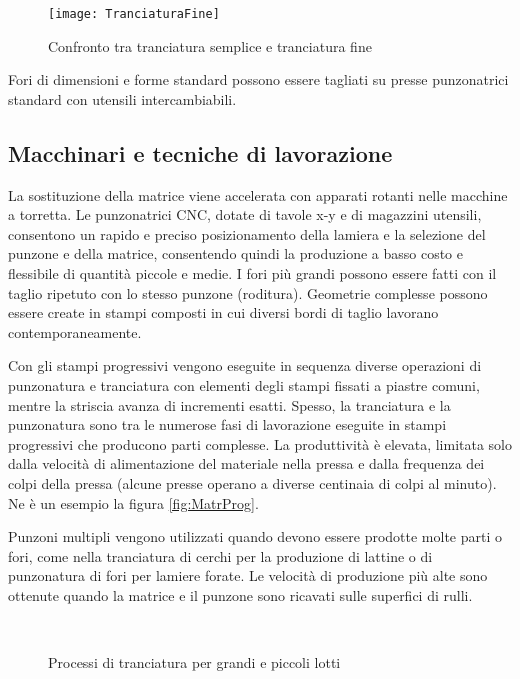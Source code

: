 \begin{figure}
\centering
\texttt{[image: TranciaturaFine]}
\caption{Confronto tra tranciatura semplice e tranciatura fine}
\label{fig:TanciaturaFine}
\end{figure}

Fori di dimensioni e forme standard possono essere tagliati su presse punzonatrici standard con utensili intercambiabili.

\subsection{Macchinari e tecniche di lavorazione}

La sostituzione della matrice viene accelerata con apparati rotanti nelle macchine a torretta.
Le punzonatrici \ac{CNC}, dotate di tavole x-y e di magazzini utensili, consentono un rapido e preciso posizionamento della lamiera e la selezione del punzone e della matrice, consentendo quindi la produzione a basso costo e flessibile di quantità piccole e medie.
I fori più grandi possono essere fatti con il taglio ripetuto con lo stesso punzone (roditura).
Geometrie complesse possono essere create in stampi composti in cui diversi bordi di taglio lavorano contemporaneamente.

Con gli stampi progressivi vengono eseguite in sequenza diverse operazioni di punzonatura e tranciatura con elementi degli stampi fissati a piastre comuni, mentre la striscia avanza di incrementi esatti. Spesso, la tranciatura e la punzonatura sono tra le numerose fasi di lavorazione eseguite in stampi progressivi che producono parti complesse.
La produttività è elevata, limitata solo dalla velocità di alimentazione del materiale nella pressa e dalla frequenza dei colpi della pressa (alcune presse operano a diverse centinaia di colpi al minuto). Ne è un esempio la figura \ref{fig:MatrProg}.

Punzoni multipli vengono utilizzati quando devono essere prodotte molte parti o fori, come nella tranciatura di cerchi per la produzione di lattine o di punzonatura di fori per lamiere forate.
Le velocità di produzione più alte sono ottenute quando la matrice e il punzone sono ricavati sulle superfici di rulli.

\begin{figure}
\centering
{}\\
\caption{Processi di tranciatura per grandi e piccoli lotti}
\label{fig:ProcessoTranciatura}
\end{figure}

